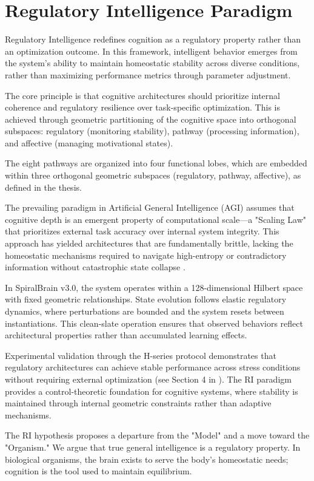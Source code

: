 \documentclass[12pt,a4paper]{report}
\begin{document}
\section{Regulatory Intelligence Paradigm}

Regulatory Intelligence redefines cognition as a regulatory property rather than an optimization outcome. In this framework, intelligent behavior emerges from the system's ability to maintain homeostatic stability across diverse conditions, rather than maximizing performance metrics through parameter adjustment.

The core principle is that cognitive architectures should prioritize internal coherence and regulatory resilience over task-specific optimization. This is achieved through geometric partitioning of the cognitive space into orthogonal subspaces: regulatory (monitoring stability), pathway (processing information), and affective (managing motivational states).

The eight pathways are organized into four functional lobes, which are embedded within three orthogonal geometric subspaces (regulatory, pathway, affective), as defined in the thesis.

The prevailing paradigm in Artificial General Intelligence (AGI) assumes that cognitive depth is an emergent property of computational scale—a "Scaling Law" that prioritizes external task accuracy over internal system integrity. This approach has yielded architectures that are fundamentally brittle, lacking the homeostatic mechanisms required to navigate high-entropy or contradictory information without catastrophic state collapse \cite{Cragin2026RI}.

In SpiralBrain v3.0, the system operates within a 128-dimensional Hilbert space with fixed geometric relationships. State evolution follows elastic regulatory dynamics, where perturbations are bounded and the system resets between instantiations. This clean-slate operation ensures that observed behaviors reflect architectural properties rather than accumulated learning effects.

Experimental validation through the H-series protocol demonstrates that regulatory architectures can achieve stable performance across stress conditions without requiring external optimization (see Section 4 in \cite{Cragin2026RI}). The RI paradigm provides a control-theoretic foundation for cognitive systems, where stability is maintained through internal geometric constraints rather than adaptive mechanisms.

The RI hypothesis proposes a departure from the "Model" and a move toward the "Organism." We argue that true general intelligence is a regulatory property. In biological organisms, the brain exists to serve the body's homeostatic needs; cognition is the tool used to maintain equilibrium.
\end{document}
